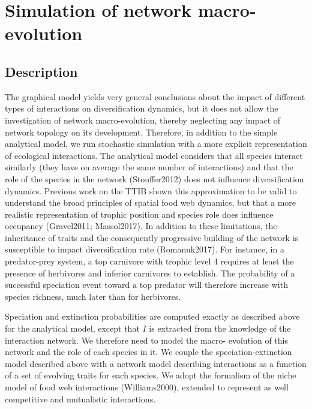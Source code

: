 \documentclass[12pt]{article}
\begin{document}
\section*{Simulation of network macro-evolution}

\subsection*{Description}

The graphical model yields very general conclusions about the impact of
different types of interactions on diversification dynamics, but it does not
allow the investigation of network macro-evolution, thereby neglecting any
impact of network topology on its development. Therefore, in addition to the
simple analytical model, we run stochastic simulation with a more explicit
representation of ecological interactions. The analytical model considers that
all species interact similarly (they have on average the same number of
interactions) and that the role of the species in the network (Stouffer2012)
does not influence diversification dynamics. Previous work on the TTIB shown
this approximation to be valid to understand the broad principles of spatial
food web dynamics, but that a more realistic representation of trophic
position and species role does influence occupancy (Gravel2011; Massol2017).
In addition to these limitations, the inheritance of traits and the
consequently progressive building of the network is susceptible to impact
diversification rate (Romanuk2017). For instance, in a predator-prey system, a
top carnivore with trophic level 4 requires at least the presence of
herbivores and inferior carnivores to establish. The probability of a
successful speciation event toward a top predator will therefore increase with
species richness, much later than for herbivores.

Speciation and extinction probabilities are computed exactly as described
above for the analytical model, except that $I$ is extracted from the
knowledge of the interaction network. We therefore need to model the macro-
evolution of this network and the role of each species in it. We couple the
speciation-extinction model described above with a network model describing
interactions as a function of a set of evolving traits for each species. We
adopt the formalism of the niche model of food web interactions
(Williams2000), extended to represent as well competitive and mutualistic
interactions.
\end{document}
